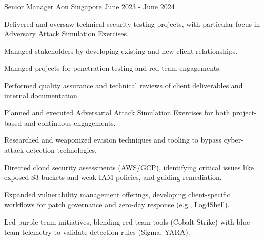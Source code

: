 \begin{cventries}
        
  \cventry
    {Senior Manager} %
    {Aon} %
    {Singapore} %
    {June 2023 - June 2024} %
    {
    \begin{cvitems} %
         \item{Delivered and oversaw technical security testing projects, with particular focus in Adversary Attack Simulation Exercises.}
        \item{Managed stakeholders by developing existing and new client relationships.}
        \item{Managed projects for penetration testing and red team engagements.}
        \item{Performed quality assurance and technical reviews of client deliverables and internal documentation.}
        \item{Planned and executed Adversarial Attack Simulation Exercises for both project-based and continuous engagements.}
        \item{Researched and weaponized evasion techniques and tooling to bypass cyber-attack detection technologies.}
        \item{Directed cloud security assessments (AWS/GCP), identifying critical issues like exposed S3 buckets and weak IAM policies, and guiding remediation.}
        \item{Expanded vulnerability management offerings, developing client-specific workflows for patch governance and zero-day response (e.g., Log4Shell).}
        \item{Led purple team initiatives, blending red team tools (Cobalt Strike) with blue team telemetry to validate detection rules (Sigma, YARA).}
    \end{cvitems}
    }


\end{cventries}
